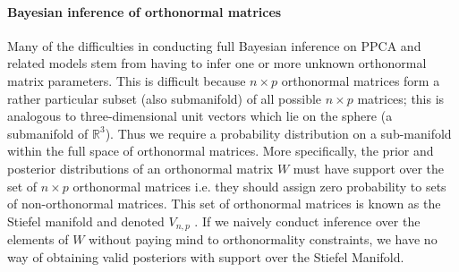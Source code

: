\documentclass{article}
\begin{document}
\paragraph{Bayesian inference of orthonormal matrices} Many of the difficulties in conducting full Bayesian inference on PPCA and related models stem from having to infer one or more unknown orthonormal matrix parameters.  This is difficult because $n\times p$ orthonormal matrices form a rather particular subset (also submanifold) of all possible $n \times p$ matrices; this is analogous to three-dimensional unit vectors which lie on the sphere (a submanifold of $\mathbb{R}^3$). Thus we require a probability distribution on a sub-manifold within the full space of orthonormal matrices.  More specifically, the prior and posterior distributions of an orthonormal matrix $W$ must have support over the set of $n \times p$ orthonormal matrices i.e. they should assign zero probability to sets of non-orthonormal matrices. This set of orthonormal matrices is known as the Stiefel manifold and denoted $V_{n,p}$ \citep{muirhead2009aspects}. If we naively conduct inference over the elements of $W$ without paying mind to orthonormality constraints, we have no way of obtaining valid posteriors with support over the Stiefel Manifold.
\end{document}
